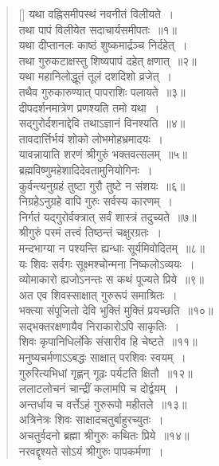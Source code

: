 \documentclass[twoside,12pt,notitlepage]{book}
\begin{document}
\begin{verse}[\versewidth]
यथा वह्निसमीपस्थं नवनीतं विलीयते~। \\[-6pt]
तथा पापं विलीयेत सदाचार्यसमीपतः~॥१॥\\
यथा दीप्तानलः काष्ठं शुष्कमार्द्रञ्च निर्दहेत्~।\\[-6pt]
तथा गुरुकटाक्षस्तु शिष्यपापं दहेत् क्षणात्~॥२॥\\
यथा महानिलोद्धूतं तूलं दशदिशो व्रजेत्~।\\[-6pt]
तथैव गुरुकारुण्यात् पापराशिः पलायते~॥३॥\\
दीपदर्शनमात्रेण प्रणश्यति तमो यथा~।\\[-6pt]
सद्गुरोर्दशनाद्देवि तथाऽज्ञानं विनश्यति~॥४॥\\
तावदार्त्तिर्भयं शोको लोभमोहभ्रमादयः~।\\[-6pt]
यावन्नायाति शरणं श्रीगुरुं भक्तवत्सलम्~॥५॥\\
ब्रह्मविष्णुमहेशादिदेवतामुनियोगिनः~।\\[-6pt]
कुर्वन्त्यनुग्रहं तुष्टा गुरौ तुष्टे न संशयः~॥६॥\\
निग्रहेऽनुग्रहे वापि गुरुः सर्वस्य कारणम्~।\\[-6pt]
निर्गतं यद्गुरोर्वक्त्रात् सर्वं शास्त्रं तदुच्यते~॥७॥\\
श्रीगुरुं परमं तत्त्वं तिष्ठन्तं चक्षुरग्रतः~।\\[-6pt]
मन्दभाग्या न पश्यन्ति ह्यन्धाः सूर्यमिवोदितम्~॥८॥\\ 
यः शिवः सर्वगः सूक्ष्मश्चोन्मना निष्कलोऽव्ययः~। \\[-6pt]
व्योमाकारो ह्यजोऽनन्तः स कथं पूज्यते प्रिये~॥९॥\\
अत एव शिवस्साक्षात् गुरुरूपं समाश्रितः~।\\[-6pt]
भक्त्या संपूजितो देवि भुक्तिं मुक्तिं प्रयच्छति~॥१०॥\\
सद्भक्तरक्षणायैव निराकारोऽपि साकृतिः~।\\[-6pt]
शिवः कृपानिधिर्लोके संसारीव हि चेष्टते~॥११॥\\
मनुष्यचर्मणाऽऽबद्धः साक्षात् परशिवः स्वयम्~।\\[-6pt]
गुरुरित्यभिधां गृह्णन् गूढः पर्यटति क्षितौ~॥१२॥\\
ललाटलोचनं चान्द्रीं कलामपि च दोर्द्वयम्~।\\[-6pt]
अन्तर्धाय च वर्त्तेऽहं गुरुरूपो महीतले~॥१३॥\\
अत्रिनेत्रः शिवः साक्षादचतुर्बाहुरच्युतः~।\\[-6pt]
अचतुर्वदनो ब्रह्मा श्रीगुरुः कथितः प्रिये~॥१४॥\\
नरवद्दृश्यते सोऽयं श्रीगुरुः पापकर्मणा~।\\[-6pt]

\end{verse}
\end{document}
